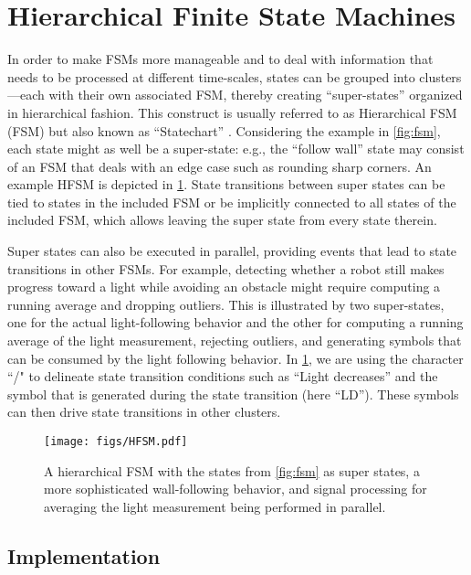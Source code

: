 \section{Hierarchical Finite State Machines}\label{sec:stateflow}

In order to make FSMs more manageable and to deal with information that needs to be processed at different time-scales, states can be grouped into clusters---each with their own associated FSM, thereby creating ``super-states'' organized in hierarchical fashion. This construct is usually referred to as Hierarchical FSM (FSM) but also known as ``Statechart'' \cite{harel1987statecharts}.
Considering the example in \cref{fig:fsm}, each state might as well be a super-state: e.g., the ``follow wall'' state may consist of an FSM that deals with an edge case such as rounding sharp corners. An example HFSM is depicted in \cref{fig:hfsm}. State transitions between super states can be tied to states in the included FSM or be implicitly connected to all states of the included FSM, which allows leaving the super state from every state therein.

Super states can also be executed in parallel, providing events that lead to state transitions in other FSMs. For example, detecting whether a robot still makes progress toward a light while avoiding an obstacle might require computing a running average and dropping outliers. This is illustrated by two super-states, one for the actual light-following behavior and the other for computing a running average of the light measurement, rejecting outliers, and generating symbols that can be consumed by the light following behavior. In \cref{fig:hfsm}, we are using the character ``/" to delineate state transition conditions such as ``Light decreases'' and the symbol that is generated during the state transition (here ``LD''). These symbols can then drive state transitions in other clusters.

\begin{figure}
\centering
    \texttt{[image: figs/HFSM.pdf]}
\caption{A hierarchical FSM with the states from \cref{fig:fsm} as super states, a more sophisticated wall-following behavior, and signal processing for averaging the light measurement being performed in parallel. \label{fig:hfsm}}
\end{figure}

\subsection{Implementation}

